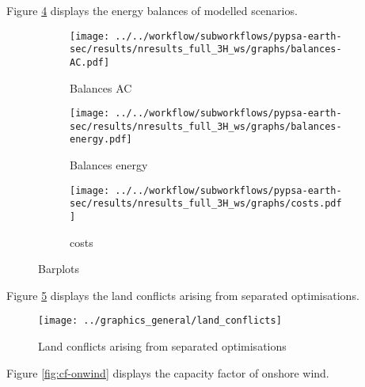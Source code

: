 Figure \ref{fig:barplots} displays the energy balances of modelled scenarios.


\begin{figure}[h!]
    \centering
    \begin{subfigure}[b]{\linewidth}
        \centering
        \texttt{[image: ../../workflow/subworkflows/pypsa-earth-sec/results/nresults\_full\_3H\_ws/graphs/balances-AC.pdf]}
        \caption{Balances AC}
        \label{fig:balances_AC}
    \end{subfigure}
    
    \vspace{0.5cm} %
    
    \begin{subfigure}[b]{\linewidth}
        \centering
        \texttt{[image: ../../workflow/subworkflows/pypsa-earth-sec/results/nresults\_full\_3H\_ws/graphs/balances-energy.pdf]}
        \caption{Balances energy}
        \label{fig:balances_energy}
    \end{subfigure}

    \vspace{0.5cm} %
    
    \begin{subfigure}[b]{\linewidth}
        \centering
        \texttt{[image: ../../workflow/subworkflows/pypsa-earth-sec/results/nresults\_full\_3H\_ws/graphs/costs.pdf]}
        \caption{costs}
        \label{fig:balances_costs}
    \end{subfigure}
    
    \caption{Barplots}
    \label{fig:barplots}
\end{figure}



Figure \ref{fig:land_conflicts} displays the land conflicts arising from separated optimisations.

\begin{figure}[h!]
    \centering
    \texttt{[image: ../graphics\_general/land\_conflicts]}
    \caption{Land conflicts arising from separated optimisations}
    \label{fig:land_conflicts}
\end{figure}


Figure \ref{fig:cf-onwind} displays the capacity factor of onshore wind.

